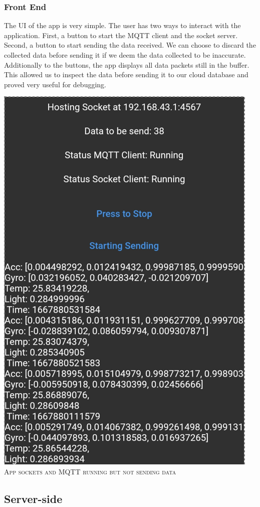 \documentclass{article}
\begin{document}
\subsubsection{Front End}
\begin{multicols}{2}
The UI of the app is very simple. The user has two ways to interact with the application. First, a button to start the MQTT client and the socket server. Second, a button to start sending the data received. We can choose to discard the collected data before sending it if we deem the data collected to be inaccurate. Additionally to the buttons, the app displays all data packets still in the buffer. This allowed us to inspect the data before sending it to our cloud database and proved very useful for debugging.


\begin{center}
 \includegraphics[height=\columnwidth]{report/images/911d517b579539015591262ca9a8d9ea.png}\\
\textsc{App sockets and MQTT running but not sending data}
\end{center}



\end{multicols}

\subsection{Server-side}
\end{document}
